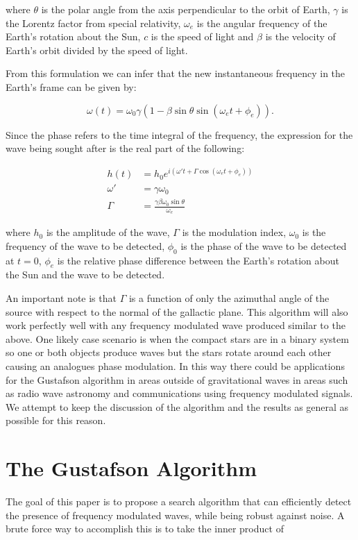 \documentclass[onecolumn, groupedaddress, 10pt]{revtex4-1}
\begin{document}
where $\theta$ is the polar angle from the axis perpendicular to the orbit of Earth, $\gamma$ is the Lorentz factor from special relativity, $\omega_e$ is the angular frequency of the Earth's rotation about the Sun, $c$ is the speed of light and $\beta$ is the velocity of Earth's orbit divided by the speed of light.

From this formulation we can infer that the new instantaneous frequency in the Earth's frame can be given by:

\begin{equation}
\omega (t) = \omega_0 \gamma \left( 1 - \beta \sin \theta \sin (\omega_e t + \phi_e) \right). 
\end{equation}

Since the phase refers to the time integral of the frequency, the expression for the wave being sought after is the real part of the following: 

\begin{align}
h(t)    &= h_0 e^{i \left( \omega' t + \Gamma \cos (\omega_e t + \phi_e) \right)}		\\
\omega' &= \gamma \omega_0															\\
\Gamma  &= \frac{\gamma \beta \omega_0 \sin \theta}{\omega_e}
\end{align}


where $h_0$ is the amplitude of the wave, $\Gamma$ is the modulation index, $\omega_0$ is the frequency of the wave to be detected, $\phi_0$ is the phase of the wave to be detected at $t=0$, $\phi_e$ is the relative phase difference between the Earth's rotation about the Sun and the wave to be detected.

An important note is that $\Gamma$ is a function of only the azimuthal angle of the source with respect to the normal of the gallactic plane. This algorithm will also work perfectly well with any frequency modulated wave produced similar to the above. One likely case scenario is when the compact stars are in a binary system so one or both objects produce waves but the stars rotate around each other causing an analogues phase modulation.  In this way there could be applications for the Gustafson algorithm in areas outside of gravitational waves in areas such as radio wave astronomy and communications using frequency modulated signals. We attempt to keep the discussion of the algorithm and the results as general as possible for this reason.

\section{The Gustafson Algorithm}
The goal of this paper is to propose a search algorithm that can efficiently detect the presence of frequency modulated waves, while being robust against noise.  A brute force way to accomplish this is to take the inner product of 
\end{document}
